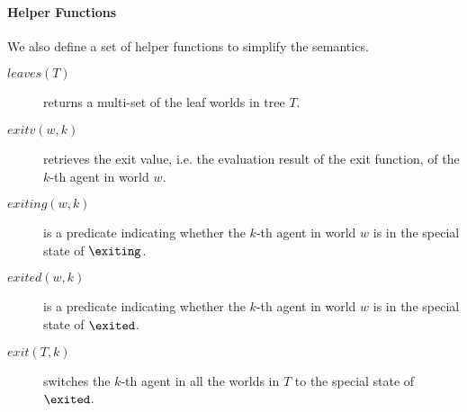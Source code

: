 \paragraph*{Helper Functions}
We also define a set of helper functions to simplify the semantics. 
\begin{description}
\item[$leaves(T)$] returns a multi-set of the leaf worlds in tree $T$. 
\item[$exitv(w,k)$] retrieves the exit value, i.e. the evaluation result of the exit function, of the $k$-th agent in world $w$.
\item[$exiting(w,k)$] is a predicate indicating whether the $k$-th agent in world $w$ is in the special state of $\exiting$.
\item[$exited(w,k)$] is a predicate indicating whether the $k$-th agent in world $w$ is in the special state of $\exited$.
\item[$exit(T,k)$] switches the $k$-th agent in all the worlds in $T$ to the special state of $\exited$.
\end{description}
